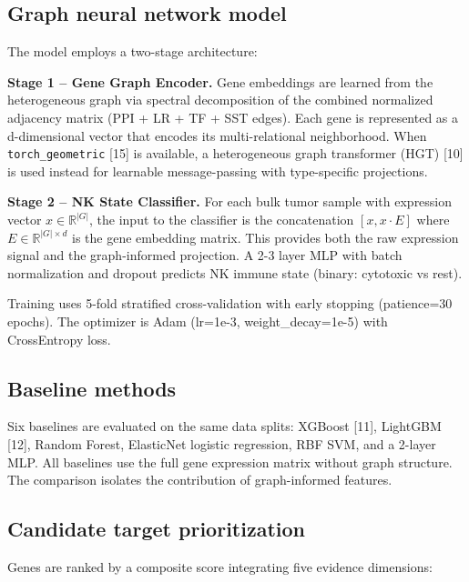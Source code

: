 \documentclass[modern,large,numbered,nocrop]{oup-authoring-template}
\begin{document}
\subsection{Graph neural network model}

The model employs a two-stage architecture:

\textbf{Stage 1 -- Gene Graph Encoder.} Gene embeddings are learned from the heterogeneous graph via spectral decomposition of the combined normalized adjacency matrix (PPI + LR + TF + SST edges). Each gene is represented as a d-dimensional vector that encodes its multi-relational neighborhood. When \texttt{torch\_geometric} [15] is available, a heterogeneous graph transformer (HGT) [10] is used instead for learnable message-passing with type-specific projections.

\textbf{Stage 2 -- NK State Classifier.} For each bulk tumor sample with expression vector $x \in \mathbb{R}^{|G|}$, the input to the classifier is the concatenation $[x, x \cdot E]$ where $E \in \mathbb{R}^{|G| \times d}$ is the gene embedding matrix. This provides both the raw expression signal and the graph-informed projection. A 2-3 layer MLP with batch normalization and dropout predicts NK immune state (binary: cytotoxic vs rest).

Training uses 5-fold stratified cross-validation with early stopping (patience=30 epochs). The optimizer is Adam (lr=1e-3, weight\_decay=1e-5) with CrossEntropy loss.

\subsection{Baseline methods}

Six baselines are evaluated on the same data splits: XGBoost [11], LightGBM [12], Random Forest, ElasticNet logistic regression, RBF SVM, and a 2-layer MLP. All baselines use the full gene expression matrix without graph structure. The comparison isolates the contribution of graph-informed features.

\subsection{Candidate target prioritization}

Genes are ranked by a composite score integrating five evidence dimensions:
\end{document}
